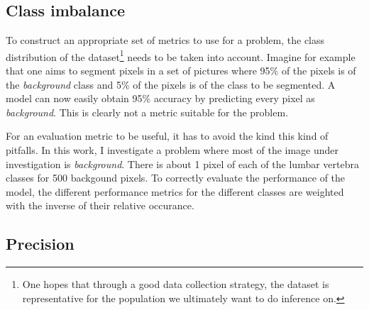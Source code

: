 \subsection{Class imbalance\label{sec:class_imbalance}}

To construct an appropriate set of metrics to use for a problem, the class distribution of the dataset\footnote{
    One hopes that through a good data collection strategy, the dataset is representative for the population we ultimately want to do inference on.

    } needs to be taken into account.
Imagine for example that one aims to segment pixels in a set of pictures where 95\% of the pixels is of the \textit{background} class and 5\% of the pixels is of the class to be segmented.
A model can now easily obtain 95\% accuracy by predicting every pixel as \textit{background}. This is clearly not a metric suitable for the problem.

For an evaluation metric to be useful, it has to avoid the kind this kind of pitfalls.
In this work, I investigate a problem where most of the image under investigation is \textit{background}. 
There is about 1 pixel of each of the lumbar vertebra classes for 500 backgound pixels.
To correctly evaluate the performance of the model, the different performance metrics for the different classes are weighted with the inverse of their relative occurance.

\subsection{Precision}

